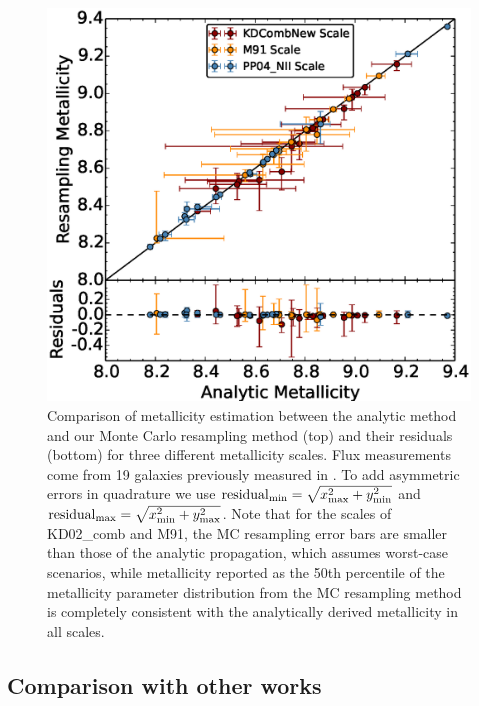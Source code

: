 \documentclass{emulateapj}
\begin{document}
\begin{figure}[ht!]
  \includegraphics[width=1.0\columnwidth]{abcomparison6.eps}
   \caption{Comparison of metallicity estimation between the analytic method and our Monte Carlo resampling method (top) and their residuals (bottom) for three different metallicity scales. Flux measurements come from 19 galaxies previously measured in \citet{modjaz11}. To add asymmetric errors in quadrature we use $\mathrm{residual}_{\rm min}=\sqrt {x_{\rm max}^2 + y_{\rm min}^2}$ and $\mathrm{residual}_{\rm max}=\sqrt {x_{\rm min}^2 + y_{\rm max}^2}$. Note that for the scales of KD02\_comb and M91,  the MC resampling error bars are smaller than those of the analytic propagation, which assumes worst-case scenarios, while metallicity reported as the 50th percentile of the metallicity parameter distribution from the MC resampling method is completely consistent with the analytically derived metallicity in all scales.}
 \label{comp_anal_MC}
\end{figure}





\subsection{Comparison with other works}
\end{document}
